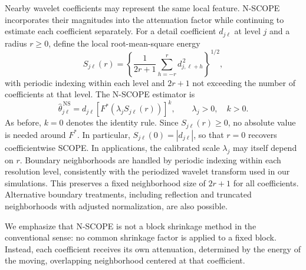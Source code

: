 \documentclass[12pt]{article}
\theoremstyle{definition}
\theoremstyle{definition}
\begin{document}
Nearby wavelet coefficients may represent the same local feature.
N-SCOPE incorporates their magnitudes into the attenuation factor while
continuing to estimate each coefficient separately. For a detail
coefficient $d_{j\ell}$ at level $j$ and a radius $r\ge0$, define the
local root-mean-square energy
\begin{equation}
S_{j\ell}(r)=\left\{\frac{1}{2r+1}
\sum_{h=-r}^{r}d_{j,\ell+h}^{\,2}\right\}^{1/2},
\label{eq:nscope-energy}
\end{equation}
with periodic indexing within each level and $2r+1$ not exceeding the
number of coefficients at that level. The N-SCOPE estimator is
\begin{equation}
\widehat\theta_{j\ell}^{\,\mathrm{NS}}
=d_{j\ell}\left[F^*\!\left(\lambda_jS_{j\ell}(r)\right)\right]^k,
\qquad \lambda_j>0,\quad k>0.
\label{eq:nscope-estimator}
\end{equation}
As before, $k=0$ denotes the identity rule. Since $S_{j\ell}(r)\ge0$,
no absolute value is needed around $F^*$. In particular,
$S_{j\ell}(0)=|d_{j\ell}|$, so that $r=0$ recovers coefficientwise
SCOPE. In applications, the calibrated scale $\lambda_j$ may itself
depend on $r$. Boundary neighborhoods are handled by periodic indexing within each resolution level, consistently with the periodized wavelet transform used in our simulations. This preserves a fixed neighborhood size of $2r+1$ for all coefficients. Alternative boundary treatments, including reflection and truncated neighborhoods with adjusted normalization, are also possible.

We emphasize that
N-SCOPE is not a block shrinkage method in the conventional sense: no
common shrinkage factor is applied to a fixed block. Instead, each
coefficient receives its own attenuation, determined by the energy of
the moving, overlapping neighborhood centered at that coefficient.
\end{document}

